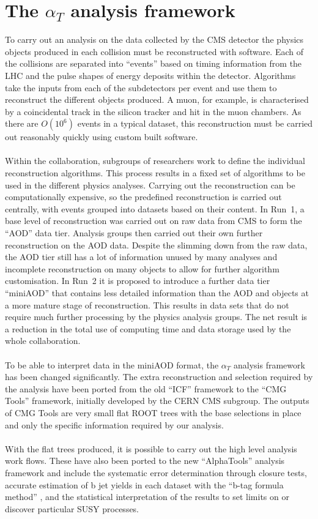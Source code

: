 
\section{The $\alpha_T$ analysis framework}
\label{sec:analysisFw}

To carry out an analysis on the data collected by the CMS detector the physics objects produced in each collision must be reconstructed with software. Each of the collisions are separated into ``events'' based on timing information from the LHC and the pulse shapes of energy deposits within the detector. Algorithms take the inputs from each of the subdetectors per event and use them to reconstruct the different objects produced. A muon, for example, is characterised by a coincidental track in the silicon tracker and hit in the muon chambers. As there are $O(10^6)$ events in a typical dataset, this reconstruction must be carried out reasonably quickly using custom built software.
\\\\
Within the collaboration, subgroups of researchers work to define the individual reconstruction algorithms. This process results in a fixed set of algorithms to be used in the different physics analyses. Carrying out the reconstruction can be computationally expensive, so the predefined reconstruction is carried out centrally, with events grouped into datasets based on their content. In Run~1, a base level of reconstruction was carried out on raw data from CMS to form the ``AOD'' data tier. Analysis groups then carried out their own further reconstruction on the AOD data. Despite the slimming down from the raw data, the AOD tier still has a lot of information unused by many analyses and incomplete reconstruction on many objects to allow for further algorithm customisation. In Run~2 it is proposed to introduce a further data tier ``miniAOD'' that contains less detailed information than the AOD and objects at a more mature stage of reconstruction. This results in data sets that do not require much further processing by the physics analysis groups. The net result is a reduction in the total use of computing time and data storage used by the whole collaboration.
\\\\
To be able to interpret data in the miniAOD format, the $\alpha_T$ analysis framework has been changed significantly. The extra reconstruction and selection required by the analysis have been ported from the old ``ICF'' framework to the ``CMG Tools'' framework, initially developed by the CERN CMS subgroup. The outputs of CMG Tools are very small flat ROOT trees with the base selections in place and only the specific information required by our analysis.
\\\\
With the flat trees produced, it is possible to carry out the high level analysis work flows. These have also been ported to the new ``AlphaTools'' analysis framework and include the systematic error determination through closure tests, accurate estimation of b jet yields in each dataset with the ``b-tag formula method'' \cite{btagformula}, and the statistical interpretation of the results to set limits on or discover particular SUSY processes.